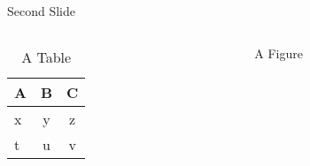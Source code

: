 \documentclass[dvipdfmx,unicode,10pt,aspectratio=43]{beamer}
\begin{document}
\begin{frame}{Second Slide}
  \begin{columns}
    \begin{column}{0.5\textwidth}
      \begin{table}
        \caption{A Table}
        \begin{tabular}{l|c c}
          \hline
          A & B & C \\
          \hline
          x & y & z \\
          t & u & v \\
          \hline
        \end{tabular}
      \end{table}
    \end{column}

    \begin{column}{0.5\textwidth}
      \begin{figure}
        \caption{A Figure}
      \end{figure}
    \end{column}
  \end{columns}
\end{frame}
\end{document}
